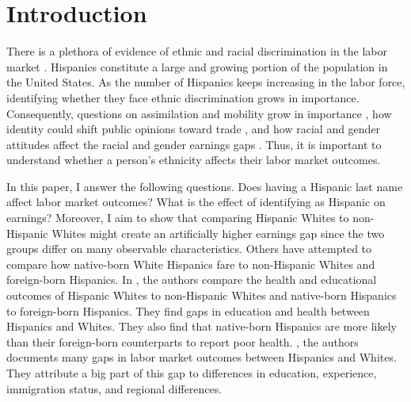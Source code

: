 \documentclass{wptemp}
\begin{document}
\section{Introduction}\label{sec:intro}

There is a plethora of evidence of ethnic and racial discrimination in the labor market \citep{bayer2018divergent, charles2008prejudice, card1992school, fryer2004causes, rubinstein2014pride, bertrand2004emily, juhn1991accounting}. Hispanics constitute a large and growing portion of the population in the United States. As the number of Hispanics keeps increasing in the labor force, identifying whether they face ethnic discrimination grows in importance. Consequently, questions on assimilation and mobility grow in importance \citep{chettyUnitedStatesStill2014, chettyEffectsExposureBetter2016,chettyFadingAmericanDream2017,abramitzkyImmigrantsAssimilateMore2020a, abramitzkyNationImmigrantsAssimilation2014,abramitzkyCulturalAssimilationAge2016,chettyWhereLandOpportunity2014}, how identity could shift public opinions toward trade \citep{grossmanIdentityPoliticsTrade2021}, and how racial and gender attitudes affect the racial and gender earnings gaps \citep{charlesPrejudiceWagesEmpirical2008,charlesEffectsSexismAmerican2018}. Thus, it is important to understand whether a person's ethnicity affects their labor market outcomes.


In this paper, I answer the following questions. Does having a Hispanic last name affect labor market outcomes? What is the effect of identifying as Hispanic on earnings? Moreover, I aim to show that comparing Hispanic Whites to non-Hispanic Whites might create an artificially higher earnings gap since the two groups differ on many observable characteristics. Others have attempted to compare how native-born White Hispanics fare to non-Hispanic Whites and foreign-born Hispanics. In \citet{antman2020ethnic,antmanEthnicAttritionObserved2016,antmanEthnicAttritionObserved2016a,antmanEthnicAttritionAssimilation2020}, the authors compare the health and educational outcomes of Hispanic Whites to non-Hispanic Whites and native-born Hispanics to foreign-born Hispanics. They find gaps in education and health between Hispanics and Whites. They also find that native-born Hispanics are more likely than their foreign-born counterparts to report poor health. \citet{davilaChangesRelativeEarnings2008}, the authors documents many gaps in labor market outcomes between Hispanics and Whites. They attribute a big part of this gap to differences in education, experience, immigration status, and regional differences. 
\end{document}
